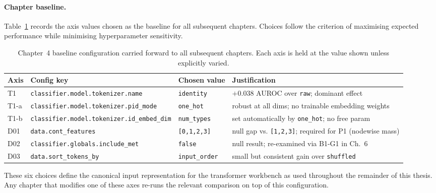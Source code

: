 \paragraph{Chapter baseline.}
Table~\ref{tab:ch4-baseline} records the axis values chosen as the baseline for all subsequent chapters.
Choices follow the criterion of maximising expected performance while minimising hyperparameter sensitivity.

\begin{table}[h]
\centering
\small
\begin{tabular}{lllp{6cm}}
\toprule
Axis & Config key & Chosen value & Justification \\
\midrule
T1   & \texttt{classifier.model.tokenizer.name}     & \texttt{identity}        & $+0.038$ AUROC over \texttt{raw}; dominant effect \\
T1-a & \texttt{classifier.model.tokenizer.pid\_mode} & \texttt{one\_hot}        & robust at all dims; no trainable embedding weights \\
T1-b & \texttt{classifier.model.tokenizer.id\_embed\_dim} & \texttt{num\_types}  & set automatically by \texttt{one\_hot}; no free param \\
D01  & \texttt{data.cont\_features}                  & \texttt{[0,1,2,3]}      & null gap vs. \texttt{[1,2,3]}; required for P1 (nodewise mass) \\
D02  & \texttt{classifier.globals.include\_met}      & \texttt{false}           & null result; re-examined via B1-G1 in Ch.~6 \\
D03  & \texttt{data.sort\_tokens\_by}                & \texttt{input\_order}    & small but consistent gain over \texttt{shuffled} \\
\bottomrule
\end{tabular}
\caption{Chapter~4 baseline configuration carried forward to all subsequent chapters.
Each axis is held at the value shown unless explicitly varied.}
\label{tab:ch4-baseline}
\end{table}

These six choices define the canonical input representation for the transformer workbench as used throughout the remainder of this thesis.
Any chapter that modifies one of these axes re-runs the relevant comparison on top of this configuration.
